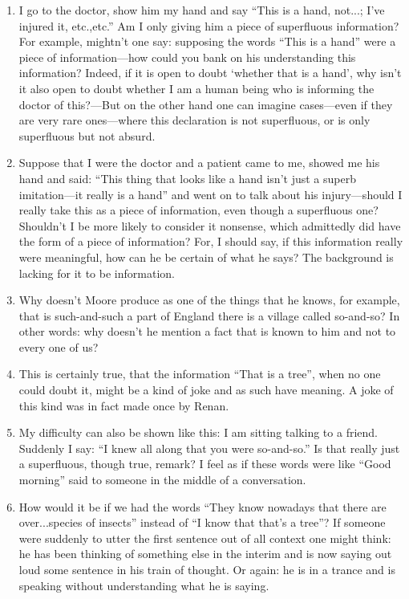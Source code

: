\documentclass{book}
\begin{document}
\begin{enumerate}
\item
I go to the doctor, show him my hand and say ``This is a hand, not...; I've
injured it, etc.,etc.'' Am I only giving him a piece of superfluous
information? For example, mightn't one say: supposing the words ``This is a
hand'' were a piece of information---how could you bank on his understanding
this information? Indeed, if it is open to doubt `whether that is a hand', why
isn't it also open to doubt whether I am a human being who is informing the
doctor of this?---But on the other hand one can imagine cases---even if they
are very rare ones---where this declaration is not superfluous, or is only
superfluous but not absurd.

\item
Suppose that I were the doctor and a patient came to me, showed me his hand and
said: ``This thing that looks like a hand isn't just a superb imitation---it
really is a hand'' and went on to talk about his injury---should I really take
this as a piece of information, even though a superfluous one? Shouldn't I be
more likely to consider it nonsense, which admittedly did have the form of a
piece of information? For, I should say, if this information really were
meaningful, how can he be certain of what he says? The background is lacking
for it to be information.

\item
Why doesn't Moore produce as one of the things that he knows, for example, that
is such-and-such a part of England there is a village called so-and-so? In
other words: why doesn't he mention a fact that is known to him and not to
every one of us?

\item
This is certainly true, that the information ``That is a tree'', when no one
could doubt it, might be a kind of joke and as such have meaning. A joke of
this kind was in fact made once by Renan.

\item
My difficulty can also be shown like this: I am sitting talking to a friend.
Suddenly I say: ``I knew all along that you were so-and-so.'' Is that really
just a superfluous, though true, remark?  I feel as if these words were like
``Good morning'' said to someone in the middle of a conversation.

\item
How would it be if we had the words ``They know nowadays that there are
over...species of insects'' instead of ``I know that that's a tree''? If
someone were suddenly to utter the first sentence out of all context one might
think: he has been thinking of something else in the interim and is now saying
out loud some sentence in his train of thought. Or again: he is in a trance and
is speaking without understanding what he is saying.


\end{enumerate}
\end{document}
